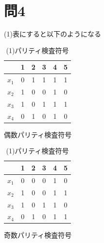\documentclass[a4paper,11pt]{ltjsarticle}
\begin{document}
\section*{問4}
(1)表にすると以下のようになる
\begin{table}[h]
  \begin{minipage}[t]{.45\textwidth}
    \begin{center}
      \begin{tabular}{c|ccccc}
        & 1 & 2 & 3 & 4 & 5 \\ \hline
        $x_{1}$ & 0 & 1 & 1 & 1 & 1 \\
        $x_{2}$ & 1 & 0 & 0 & 1 & 0 \\
        $x_{3}$ & 1 & 0 & 1 & 1 & 1 \\
        $x_{4}$ & 0 & 1 & 0 & 1 & 0 \\
      \end{tabular}
      \caption{偶数パリティ検査符号}
    \end{center}
  \end{minipage}
  \hfill
  \begin{minipage}[t]{.45\textwidth}
    \begin{center}
      \begin{tabular}{c|ccccc}
        & 1 & 2 & 3 & 4 & 5 \\ \hline
        $x_{1}$ & 0 & 0 & 0 & 1 & 0 \\
        $x_{2}$ & 1 & 0 & 0 & 1 & 1 \\
        $x_{3}$ & 1 & 0 & 1 & 1 & 0 \\
        $x_{4}$ & 0 & 1 & 0 & 1 & 1 \\
      \end{tabular}
      \caption{奇数パリティ検査符号}
    \end{center}
  \end{minipage}
  \caption{(1)パリティ検査符号}
\end{table}
\end{document}
